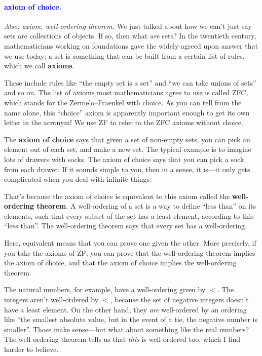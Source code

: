 \documentclass[11pt,paper=letter]{scrartcl}
\renewcommand{\bluebf}[1]{{\bfseries \color{Blue} #1}}
\renewcommand\wp[1]{\paragraph{\textcolor{Blue}{#1.}} \hspace{-1em}}
\newcommand\wl[1]{\label{w:#1}}
\newcommand\oww[1]{\textit{Also: #1.}}
\begin{document}
\wp{axiom of choice}
\wl{axiom of choice}
\oww{axiom, well-ordering theorem}
We just talked about how we can't just say sets are collections of objects. If so, then what \textit{are} sets? In the twentieth century, mathematicians working on foundations gave the widely-agreed upon answer that we use today: a set is something that can be built from a certain list of rules, which we call \textbf{axioms}.

These include rules like ``the empty set is a set'' and ``we can take unions of sets'' and so on. The list of axioms most mathematicians agree to use is called ZFC, which stands for the Zermelo--Fraenkel with choice. As you can tell from the name alone, this ``choice'' axiom is apparently important enough to get its own letter in the acronym! We use ZF to refer to the ZFC axioms without choice.

The \bluebf{axiom of choice} says that given a set of non-empty sets, you can pick an element out of each set, and make a new set. The typical example is to imagine lots of drawers with socks. The axiom of choice says that you can pick a sock from each drawer. If it sounds simple to you, then in a sense, it is---it only gets complicated when you deal with infinite things.

That's because the axiom of choice is equivalent to this axiom called the \textbf{well-ordering theorem}. A well-ordering of a set is a way to define ``less than'' on its elements, such that every subset of the set has a least element, according to this ``less than''. The well-ordering theorem says that every set has a well-ordering.

\begin{remboxed}
  Here, equivalent means that you can prove one given the other. More precisely, if you take the axioms of ZF, you can prove that the well-ordering theorem implies the axiom of choice, and that the axiom of choice implies the well-ordering theorem.
\end{remboxed}

The natural numbers, for example, have a well-ordering given by $<$. The integers aren't well-ordered by $<$, because the set of negative integers doesn't have a least element. On the other hand, they \textit{are} well-ordered by an ordering like ``the smallest absolute value, but in the event of a tie, the negative number is smaller''. Those make sense---but what about something like the real numbers? The well-ordering theorem tells us that \textit{this} is well-ordered too, which I find harder to believe.
\end{document}
